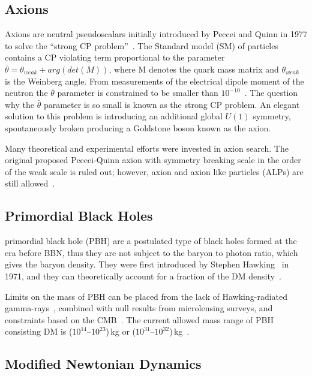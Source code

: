\subsection{Axions}

Axions are neutral pseudoscalars initially introduced by Peccei and Quinn in 1977 to solve the ``strong CP problem''~\cite{Peccei:1977hh}. The Standard model (SM) of particles contains a CP violating term proportional to the parameter $\bar{\theta} = \theta_{weak}+ arg(det(M))$, where M denotes the quark mass matrix and $\theta_{weak}$ is the Weinberg angle. From measurements  of the electrical dipole moment of the neutron the $\bar{\theta}$ parameter is constrained to be smaller than $10^{-10}$~\cite{Pospelov:2005pr,Baker:2006ts}. The question why the $\bar{\theta}$ parameter is so small is known as the strong CP problem. An elegant solution to this problem is introducing an additional global $U(1)$ symmetry, spontaneously broken producing a Goldstone boson known as the axion. 

Many theoretical and experimental efforts were invested in axion search. The original proposed Peccei-Quinn axion with symmetry breaking scale in the order of the weak scale is ruled out; however, axion and axion like particles (ALPs) are still allowed~\cite{Kim:1979if,Akerib:2017uem}. 

\subsection{Primordial Black Holes}
primordial black hole (PBH) are a postulated type of black holes formed at the era before BBN, thus they are not subject to the baryon to photon ratio, which gives the baryon density. They were first introduced by Stephen Hawking~\cite{PBH} in 1971, and they can theoretically account for a fraction of the DM density~\cite{Carr:2016drx}. 

Limits on the mass of PBH can be placed from the lack
of Hawking-radiated gamma-rays~\cite{MacGibbon:1987my}, combined with null results from microlensing surveys, and constraints based on the CMB~\cite{Ricotti:2007au}. The current allowed mass range of PBH consisting DM is ($10^{14}$--$10^{23}$)\,kg or ($10^{31}$--$10^{32}$)\,kg~\cite{Bird:2016dcv}.

\subsection{Modified Newtonian Dynamics}
\label{subsec:MOND}

